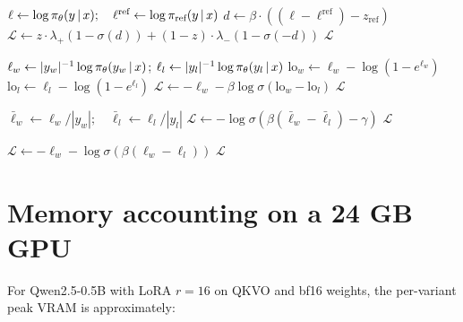 \documentclass[11pt,oneside]{scrbook}
\begin{document}
\begin{algorithm}[H]
\SetAlgoLined\DontPrintSemicolon
{}
$\ell \gets \log\pi_\theta(y \,\vert\, x);\quad \ell^{\text{ref}} \gets \log\pi_{\text{ref}}(y \,\vert\, x)$ \;
$d \gets \beta\cdot((\ell - \ell^{\text{ref}}) - z_{\text{ref}})$ \;
$\mathcal{L} \gets z \cdot \lambda_+ (1 - \sigma(d)) + (1 - z) \cdot \lambda_- (1 - \sigma(-d))$ \;
\Return $\mathcal{L}$ \;
\caption{KTO step (unpaired).}
\end{algorithm}

\begin{algorithm}[H]
\SetAlgoLined\DontPrintSemicolon
{}
$\ell_w \gets |y_w|^{-1}\log\pi_\theta(y_w\,\vert\, x)$; $\ell_l \gets |y_l|^{-1}\log\pi_\theta(y_l\,\vert\, x)$ \;
$\mathrm{lo}_w \gets \ell_w - \log(1 - e^{\ell_w})$ 
$\mathrm{lo}_l \gets \ell_l - \log(1 - e^{\ell_l})$ \;
$\mathcal{L} \gets -\ell_w - \beta \log\sigma(\mathrm{lo}_w - \mathrm{lo}_l)$ 
\Return $\mathcal{L}$ \;
\caption{ORPO step (one-stage, reference-free).}
\end{algorithm}

\begin{algorithm}[H]
\SetAlgoLined\DontPrintSemicolon
{}
$\bar\ell_w \gets \ell_w / |y_w|;\quad \bar\ell_l \gets \ell_l / |y_l|$ \;
$\mathcal{L} \gets -\log\sigma(\beta(\bar\ell_w - \bar\ell_l) - \gamma)$ \;
\Return $\mathcal{L}$ \;
\caption{SimPO step (reference-free, length-normalised).}
\end{algorithm}

\begin{algorithm}[H]
\SetAlgoLined\DontPrintSemicolon
{}
$\mathcal{L} \gets -\ell_w - \log\sigma(\beta(\ell_w - \ell_l))$ \;
\Return $\mathcal{L}$ \;
\caption{CPO step (SFT + contrastive, reference-free).}
\end{algorithm}

\section{Memory accounting on a 24 GB GPU}

For Qwen2.5-0.5B with LoRA $r=16$ on QKVO and bf16 weights, the
per-variant peak VRAM is approximately:
\end{document}
